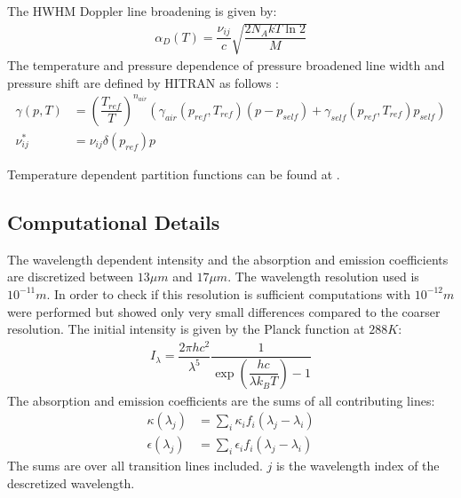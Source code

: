 The HWHM Doppler line broadening is given by: 
\begin{align*}
	\alpha_D(T) = \dfrac{\nu_{ij}}{c} \sqrt{\dfrac{2 N_A k T \ln 2}{M}}
\end{align*}
The temperature and pressure dependence of pressure broadened line width and pressure shift are defined by HITRAN as follows \cite{hitran2}: 
\begin{align*}
	\gamma(p, T) &= \left(\dfrac{T_{ref}}{T}\right)^{n_{air}}  
	               \left(  \gamma_{air} (p_{ref}, T_{ref}) (p - p_{self}) +
	                       \gamma_{self}(p_{ref}, T_{ref}) p_{self}  \right) 		 \\
	\nu_{ij}^*   &= \nu_{ij} \delta(p_{ref}) p
\end{align*}

Temperature dependent partition functions can be found at \cite{hitran3}.


\subsection{Computational Details}

The wavelength dependent intensity and the absorption and emission coefficients are discretized between $13 \mu m$ and $17 \mu m$. The wavelength resolution used is $10^{-11} m$. In order to check if this resolution is sufficient computations with $10^{-12} m$ were performed but showed only very small differences compared to the coarser resolution.      
\newline
\newline
The initial intensity is given by the Planck function at $288 K$:
\begin{align}
	I_\lambda = \dfrac{2 \pi h c^2}{\lambda^5} \dfrac{1}{\exp\left(\dfrac{h c}{\lambda k_B T}\right) - 1}
\end{align}
The absorption and emission coefficients are the sums of all contributing lines: 
\begin{align*}
	\kappa(\lambda_j) &= \sum_i \kappa_i f_i(\lambda_j - \lambda_i) \\
	\epsilon(\lambda_j) &= \sum_i \epsilon_i f_i(\lambda_j - \lambda_i)
\end{align*}
The sums are over all transition lines included. $j$ is the wavelength index of the descretized wavelength. 


